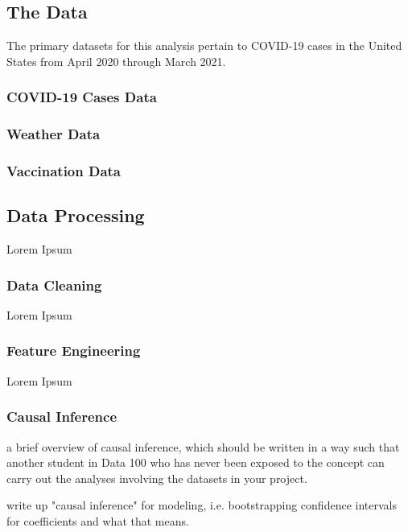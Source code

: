\documentclass[11pt]{article}
\begin{document}
\subsection{The Data}

The primary datasets for this analysis pertain to COVID-19 cases in the United States from April 2020 through March 2021.  

\subsubsection*{COVID-19 Cases Data}


\subsubsection*{Weather Data}

\subsubsection*{Vaccination Data}



\subsection{Data Processing}
Lorem Ipsum \\

\subsubsection{Data Cleaning}
Lorem Ipsum \\

\subsubsection{Feature Engineering}
Lorem Ipsum \\


\subsubsection{Causal Inference}
a brief overview of causal inference, which should be written in a way such that another student in Data 100 who has never been exposed to the concept can carry out the analyses involving the datasets in your project.

write up "causal inference" for modeling, i.e. bootstrapping confidence intervals for coefficients and what that means. 
\end{document}
